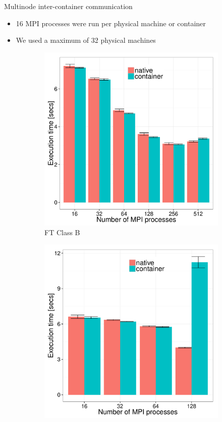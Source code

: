 \documentclass[11pt,xcolor=dvipsnames,presentation]{beamer}
\begin{document}
\begin{frame}[label=sec-4-0-7]{Multinode inter-container communication}
\begin{itemize}
\item 16 MPI processes were run per physical machine or container
\item We used a maximum of 32 physical machines
\end{itemize}

\begin{figure}
  \centering
  \begin{subfigure}[b]{0.42\textwidth}
    \includegraphics[scale=0.25,angle=0]{figures/veth_overhead-tso-ftB.pdf}
    \caption{FT Class B}
  \end{subfigure}
  \begin{subfigure}[b]{0.42\textwidth}
    \includegraphics[scale=0.25,angle=0]{figures/veth_overhead-tso-cgB.pdf}

\end{subfigure}
\end{figure}
\end{frame}
\end{document}
